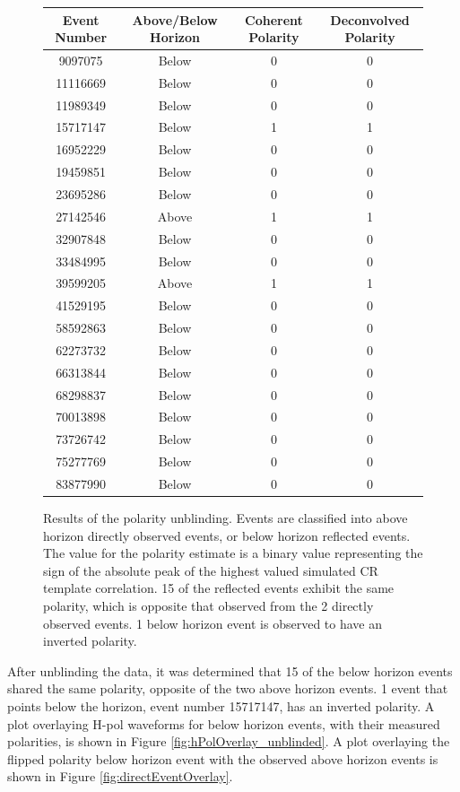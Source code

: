 	\begin{figure}
	\centering
	\begin{tabular}[c]{|c|c|c|c|}
	\hline
	Event Number & Above/Below Horizon & Coherent Polarity & Deconvolved Polarity \\
	\hline
  9097075 & Below &  0 & 0 \\
 11116669 & Below &  0 & 0 \\
 11989349 & Below &  0 & 0 \\
 \hline
 15717147 & Below &  1 & 1 \\
 \hline
 16952229 & Below &  0 & 0 \\
 19459851 & Below &  0 & 0 \\
 23695286 & Below &  0 & 0 \\
 \hline
 27142546 & Above &  1 & 1 \\
 \hline
 32907848 & Below &  0 & 0 \\
 33484995 & Below &  0 & 0 \\
 \hline
 39599205 & Above &  1 & 1 \\
 \hline
 41529195 & Below &  0 & 0 \\
 58592863 & Below &  0 & 0 \\
 62273732 & Below &  0 & 0 \\
 66313844 & Below &  0 & 0 \\
 68298837 & Below &  0 & 0 \\
 70013898 & Below &  0 & 0 \\
 73726742 & Below &  0 & 0 \\
 75277769 & Below &  0 & 0 \\
 83877990 & Below &  0 & 0 \\
 \hline
 \end{tabular}
	\caption{Results of the polarity unblinding.  Events are classified into above horizon directly observed events, or below horizon reflected events.  The value for the polarity estimate is a binary value representing the sign of the absolute peak of the highest valued simulated CR template correlation.  15 of the reflected events exhibit the same polarity, which is opposite that observed from the 2 directly observed events.  1 below horizon event is observed to have an inverted polarity.}%
\label{tab:polarityUnblinding}
\end{figure}
	
	  After unblinding the data, it was determined that 15 of the below horizon events shared the same polarity, opposite of the two above horizon events.  1 event that points below the horizon, event number 15717147, has an inverted polarity.  A plot overlaying H-pol waveforms for below horizon events, with their measured polarities, is shown in Figure \ref{fig:hPolOverlay_unblinded}.  A plot overlaying the flipped polarity below horizon event with the observed above horizon events is shown in Figure \ref{fig:directEventOverlay}.
	  
